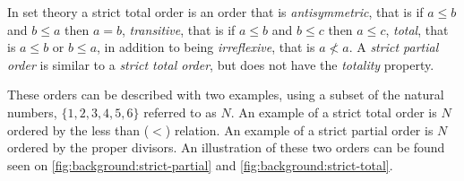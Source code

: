 		\newpar In set theory a strict total order is an order that is \textit{antisymmetric}, that is if $a \leq b$ and $b \leq a$ then $a = b$, \textit{transitive}, that is if $a \leq b$ and $b \leq c$ then $a \leq c$, \textit{total}, that is $a \leq b$ or $b \leq a$, in addition to being \textit{irreflexive}, that is $a \not< a$. A \textit{strict partial order} is similar to a \textit{strict total order}, but does not have the \textit{totality} property.
        
		These orders can be described with two examples, using a subset of the natural numbers, $\{1, 2, 3, 4, 5, 6\}$ referred to as $N$. An example of a strict total order is $N$ ordered by the less than ($<$) relation. An example of a strict partial order is $N$ ordered by the proper divisors. An illustration of these two orders can be found seen on \autoref{fig:background:strict-partial} and \autoref{fig:background:strict-total}.
	
